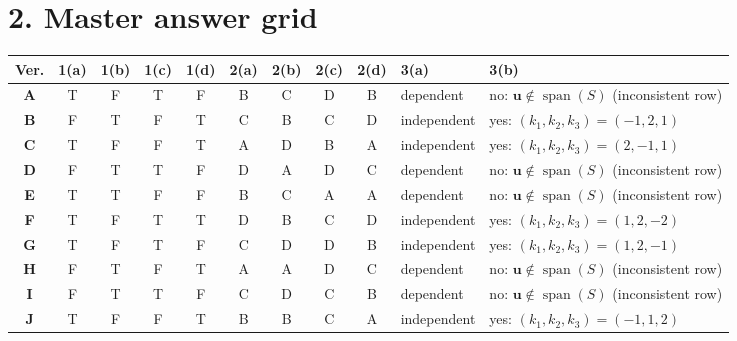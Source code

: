 \documentclass[11pt,a4paper]{article}
\begin{document}
\section*{2. Master answer grid}
{\small\begin{tabularx}{\linewidth}{@{}c cccc cccc l X@{}}\toprule
Ver. & 1(a) & 1(b) & 1(c) & 1(d) & 2(a) & 2(b) & 2(c) & 2(d) & 3(a) & 3(b) \\\midrule
\textbf{A} & T & F & T & F & B & C & D & B & dependent & no: $\mathbf{u}\notin\operatorname{span}(S)$ (inconsistent row) \\
\textbf{B} & F & T & F & T & C & B & C & D & independent & yes: $(k_1,k_2,k_3)=(-1,2,1)$ \\
\textbf{C} & T & F & F & T & A & D & B & A & independent & yes: $(k_1,k_2,k_3)=(2,-1,1)$ \\
\textbf{D} & F & T & T & F & D & A & D & C & dependent & no: $\mathbf{u}\notin\operatorname{span}(S)$ (inconsistent row) \\
\textbf{E} & T & T & F & F & B & C & A & A & dependent & no: $\mathbf{u}\notin\operatorname{span}(S)$ (inconsistent row) \\
\textbf{F} & T & F & T & T & D & B & C & D & independent & yes: $(k_1,k_2,k_3)=(1,2,-2)$ \\
\textbf{G} & T & F & T & F & C & D & D & B & independent & yes: $(k_1,k_2,k_3)=(1,2,-1)$ \\
\textbf{H} & F & T & F & T & A & A & D & C & dependent & no: $\mathbf{u}\notin\operatorname{span}(S)$ (inconsistent row) \\
\textbf{I} & F & T & T & F & C & D & C & B & dependent & no: $\mathbf{u}\notin\operatorname{span}(S)$ (inconsistent row) \\
\textbf{J} & T & F & F & T & B & B & C & A & independent & yes: $(k_1,k_2,k_3)=(-1,1,2)$ \\
\bottomrule\end{tabularx}}
\end{document}
